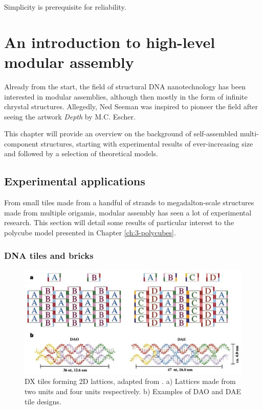 \begin{savequote}[8cm]
Simplicity is prerequisite for reliability.
\end{savequote}

\chapter{An introduction to high-level modular assembly}

\minitoc

Already from the start, the field of structural DNA nanotechnology has been interested in modular assemblies, although then mostly in the form of infinite chrystal structures. Allegedly, Ned Seeman was inspired to pioneer the field after seeing the artwork \emph{Depth} by M.C. Escher.

This chapter will provide an overview on the background of self-assembled multi-component structures, starting with experimental results of ever-increasing size and followed by a selection of theoretical models.

\section{Experimental applications} \label{sec:experimental_appl}
From small tiles made from a handful of strands to megadalton-scale structures made from multiple origamis, modular assembly has seen a lot of experimental research. This section will detail some results of particular interest to the polycube model presented in Chapter \ref{ch:3-polycubes}.

\subsection{DNA tiles and bricks}

\begin{figure}[h]
  \centering\includegraphics[width=\textwidth]{figures/dna_tiles.png}
  \caption{DX tiles forming 2D lattices, adapted from \cite{winfree1998design}. a) Lattices made from two units and four units respectively. b) Examples of DAO and DAE tile designs.}
  \label{fig:dna_tiles}
\end{figure}

